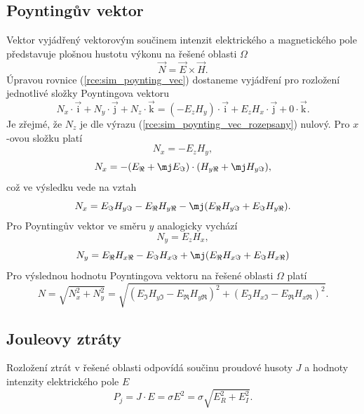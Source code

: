 \subsection*{Poyntingův vektor}
Vektor vyjádřený vektorovým součinem intenzit elektrického a magnetického pole představuje plošnou hustotu výkonu na řešené oblasti $\Omega$
\begin{equation}
	\vec N = \vec E \times\vec H.
	\label{rce:sim_poynting_vec}
\end{equation}
Úpravou rovnice (\ref{rce:sim_poynting_vec}) dostaneme vyjádření pro rozložení jednotlivé složky Poyntingova vektoru
\begin{equation}
	N_x \cdot\overrightarrow{\mathrm{i}} + N_y \cdot\overrightarrow{\mathrm{j}} + N_z \cdot\overrightarrow{\mathrm{k}} = (-E_z H_y) \cdot\overrightarrow{\mathrm{i}} + E_z H_x \cdot\overrightarrow{\mathrm{j}} + 0 \cdot\overrightarrow{\mathrm{k}}.
	\label{rce:sim_poynting_vec_rozepsany}
\end{equation}
Je zřejmé, že $N_z$ je dle výrazu (\ref{rce:sim_poynting_vec_rozepsany}) nulový. Pro $x$-ovou složku platí
\begin{displaymath}
	N_x = -E_z H_y,
\end{displaymath}
\begin{displaymath}
	N_x = -(E_\Re + \mj E_\Im)\cdot (H_{y\Re} + \mj H_{y\Im}),
\end{displaymath}
což ve výsledku vede na vztah
\begin{displaymath}
	N_x = E_\Im H_{y\Im} - E_\Re H_{y\Re} - \mj (E_\Re H_{y\Im} + E_\Im H_{y\Re}).
\end{displaymath}
Pro Poyntingův vektor ve směru $y$ analogicky vychází
\begin{displaymath}
	N_y = E_z H_x,
\end{displaymath}
\begin{displaymath}
	N_y = E_\Re H_{x\Re} - E_\Im H_{x\Im} + \mj (E_\Re H_{x\Im} + E_\Im H_{x\Re})
\end{displaymath}
Pro výslednou hodnotu Poyntingova vektoru na řešené oblasti $\Omega$ platí
\begin{displaymath}
	N = \sqrt{N_{x}^{2} + N_{y}^{2}} = \sqrt{(E_\Im H_{y\Im} - E_\Re H_{y\Re})^{2} + (E_\Im H_{x\Im} - E_\Re H_{x\Re})^{2}}.
\end{displaymath}

\subsection*{Jouleovy ztráty}
Rozložení ztrát v řešené oblasti odpovídá součinu proudové husoty $J$ a hodnoty intenzity elektrického pole $E$ 
\begin{displaymath}
	P_j = J \cdot E = \sigma E^{2} = \sigma \sqrt{E_{R}^{2} + E_{I}^{2}}.
\end{displaymath}


